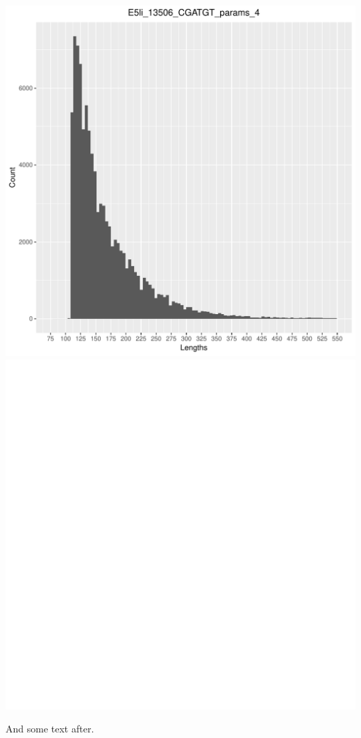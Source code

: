 \documentclass[12pt, a4paper]{article}\usepackage[]{graphicx}\usepackage[]{color}
\begin{document}
\includegraphics[width=.5\linewidth]{figure/unnamed-chunk-4-15} 
\includegraphics[width=.5\linewidth]{figure/unnamed-chunk-4-16} 




And some text after.
\end{document}
